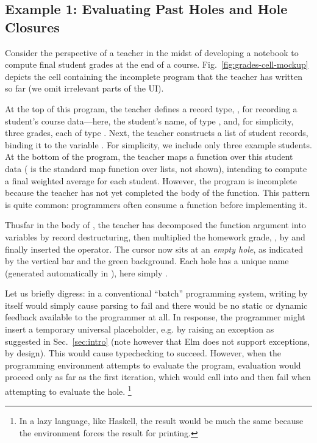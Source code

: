 
\subsection{Example 1: Evaluating Past Holes and Hole Closures}

Consider the perspective of a teacher in the midst of developing a \Hazel{} notebook
to compute final student grades at the end of a course.
Fig.~\ref{fig:grades-cell-mockup} depicts the cell containing the incomplete program that 
the teacher has written so far (we omit irrelevant parts of the UI). 
%

At the top of this program, the teacher defines a
record type, , for recording a student's course data---here,
the student's name, of type
, and, for simplicity, three grades, each of type . Next, the teacher constructs a list of student records, binding it to the variable . For simplicity, we include only three example students.
At the bottom of the program, the teacher maps a function  over this student data ( is the standard map function over lists, not shown), intending to compute a final weighted average for each student.
However, the program is incomplete because the teacher has not yet completed the body of the  function. This pattern is quite common: programmers often consume a function before implementing it.

Thusfar in the body of , the teacher has decomposed the function argument into variables by record destructuring, then multiplied the homework grade, , by  and finally inserted the \li{+} operator. The cursor now sits at an \emph{empty hole}, as indicated by the vertical bar and the green background. Each hole has a unique name (generated automatically in \Hazel), here simply . 

Let us briefly digress: in a conventional ``batch'' programming system, writing  by itself would simply cause parsing to fail and there would be no static or dynamic feedback available to the programmer at all.
In response, the programmer might insert a temporary universal placeholder, e.g. by raising an exception as suggested in Sec.~\ref{sec:intro} (note however that Elm does not support exceptions, by design). This would cause typechecking to succeed. 
However, when the programming environment attempts to evaluate the program, 
evaluation would proceed only as far as the first  iteration, 
which would call into  and then fail when attempting to evaluate the hole.%
\footnote{In a lazy language, like Haskell, the result would be much the same because the environment forces the result for printing.}

